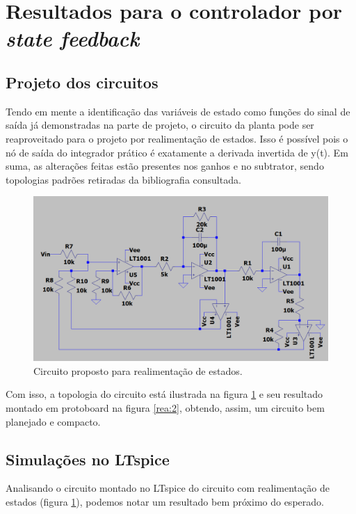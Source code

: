 \section{Resultados para o controlador por \textit{state feedback}}

\subsection{Projeto dos circuitos}

Tendo em mente a identificação das variáveis de estado como funções do sinal de saída já demonstradas na parte de projeto, o circuito da planta pode ser reaproveitado para o projeto por realimentação de estados. Isso é possível pois o nó de saída do integrador prático é exatamente a derivada invertida de y(t). Em suma, as alterações feitas estão presentes nos ganhos e no subtrator, sendo topologias padrões retiradas da bibliografia consultada. 


\begin{figure}[H]
\begin{center}
    \includegraphics[width=16cm]{images/state/circuitoLT.png}  
\end{center}
\caption{Circuito proposto para realimentação de estados.}
\label{rea:1} 
\end{figure}

Com isso, a topologia do circuito está ilustrada na figura \ref{rea:1} e seu resultado montado em protoboard na figura \ref{rea:2}, obtendo, assim, um circuito bem planejado e compacto.

\subsection{Simulações no LTspice}

Analisando o circuito montado no LTspice do circuito com realimentação de estados (figura \ref{rea:1}), podemos notar um resultado bem próximo do esperado.  

